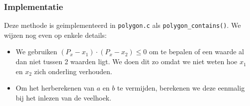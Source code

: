 \subsubsection{Implementatie}
Deze methode is geimplementeerd in \texttt{polygon.c} als \texttt{polygon\_contains()}.
We wijzen nog even op enkele details:
\begin{itemize}
\item We gebruiken $(P_x-x_1)\cdot(P_x-x_2)\leq0$ om te bepalen of een waarde al dan niet
		tussen 2 waarden ligt. We doen dit zo omdat we niet weten hoe $x_1$ en $x_2$
		zich onderling verhouden.
\item Om het herberekenen van $a$ en $b$ te vermijden, berekenen we deze eenmalig bij het inlezen van de veelhoek.

\end{itemize}


